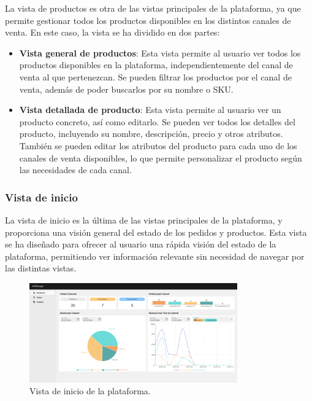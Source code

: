 La vista de productos es otra de las vistas principales de la plataforma, ya que permite gestionar todos los productos disponibles en los distintos canales de venta. En este caso, la vista se ha dividido en dos partes:
\begin{itemize}
    \item \textbf{Vista general de productos}: Esta vista permite al usuario ver todos los productos disponibles en la plataforma, independientemente del canal de venta al que pertenezcan. Se pueden filtrar los productos por el canal de venta, además de poder buscarlos por su nombre o SKU.
    \item \textbf{Vista detallada de producto}: Esta vista permite al usuario ver un producto concreto, así como editarlo. Se pueden ver todos los detalles del producto, incluyendo su nombre, descripción, precio y otros atributos. También se pueden editar los atributos del producto para cada uno de los canales de venta disponibles, lo que permite personalizar el producto según las necesidades de cada canal.
\end{itemize}




\subsubsection{Vista de inicio}
\label{dev:subsubsec:vista_inicio}
La vista de inicio es la última de las vistas principales de la plataforma, y proporciona una visión general del estado de los pedidos y productos. Esta vista se ha diseñado para ofrecer al usuario una rápida visión del estado de la plataforma, permitiendo ver información relevante sin necesidad de navegar por las distintas vistas.

\begin{figure}[H]
    \centering
    \includegraphics[width=0.8\textwidth]{figures/design_develop/screenshots/dashboard.png}
    \caption{Vista de inicio de la plataforma.}
    \label{fig:dev:ss:vista_inicio}
\end{figure}

